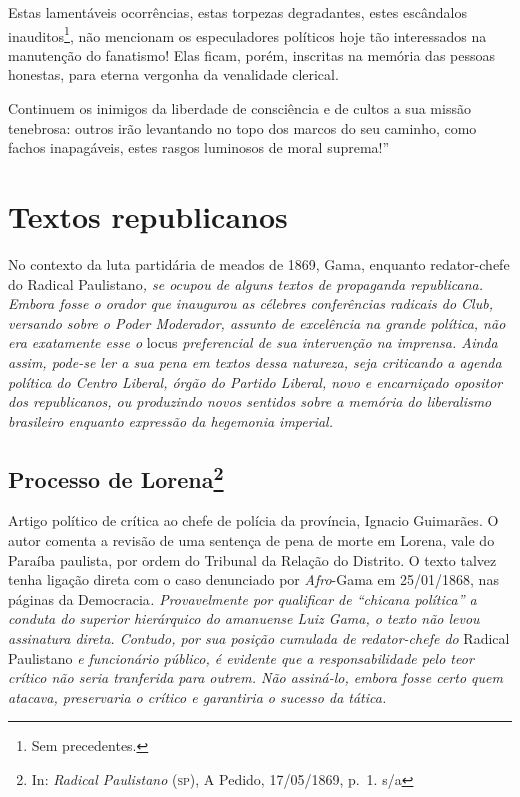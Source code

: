 Estas lamentáveis ocorrências, estas torpezas degradantes, estes
escândalos inauditos\footnote{Sem precedentes.}, não mencionam os
especuladores políticos hoje tão interessados na manutenção do
fanatismo! Elas ficam, porém, inscritas na memória das pessoas honestas,
para eterna vergonha da venalidade clerical.

Continuem os inimigos da liberdade de consciência e de cultos a sua
missão tenebrosa: outros irão levantando no topo dos marcos do seu
caminho, como fachos inapagáveis, estes rasgos luminosos de moral
suprema!''

\part{Textos republicanos}

\begin{argumento}
No contexto da luta partidária de meados de 1869, Gama, enquanto
redator-chefe do Radical Paulistano\emph{, se ocupou de alguns textos
de propaganda republicana. Embora fosse o orador que inaugurou as
célebres conferências radicais do Club, versando sobre o Poder
Moderador, assunto de excelência na grande política, não era exatamente
esse o} locus \emph{preferencial de sua intervenção na imprensa. Ainda
assim, pode-se ler a sua pena em textos dessa natureza, seja criticando
a agenda política do Centro Liberal, órgão do Partido Liberal, novo e
encarniçado opositor dos republicanos, ou produzindo novos sentidos
sobre a memória do liberalismo brasileiro enquanto expressão da
hegemonia imperial.}
\end{argumento}

\chapter{Processo de Lorena\footnote{In: \emph{Radical Paulistano} (\textsc{sp}), A
  Pedido, 17/05/1869, p.~1. s/a}}

\begin{didascalia}
Artigo político de crítica ao chefe de polícia da província, Ignacio
Guimarães. O autor comenta a revisão de uma sentença de pena de morte em
Lorena, vale do Paraíba paulista, por ordem do Tribunal da Relação do
Distrito. O texto talvez tenha ligação direta com o caso denunciado
por\emph{ Afro}-Gama em 25/01/1868, nas páginas da Democracia\emph{.
Provavelmente por qualificar de ``chicana política'' a conduta do superior
hierárquico do amanuense Luiz Gama, o texto não levou assinatura direta.
Contudo, por sua posição cumulada de redator-chefe do} Radical
Paulistano \emph{e funcionário público, é evidente que a
responsabilidade pelo teor crítico não seria tranferida para outrem. Não
assiná-lo, embora fosse certo quem atacava, preservaria o crítico e
garantiria o sucesso da tática.}
\end{didascalia}



